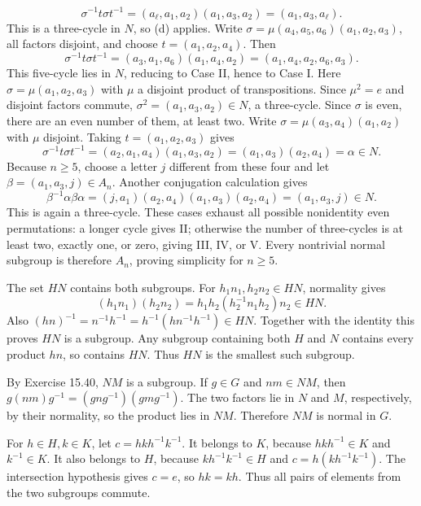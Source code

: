 \begin{enumerate}[label=(\alph*)]
\[\sigma^{-1}t\sigma t^{-1}=(a_\ell,a_1,a_2)(a_1,a_3,a_2)=(a_1,a_3,a_\ell).\]
This is a three-cycle in $N$, so (d) applies.
 Write $\sigma=\mu(a_4,a_5,a_6)(a_1,a_2,a_3)$, all factors disjoint, and choose $t=(a_1,a_2,a_4)$. Then
\[\sigma^{-1}t\sigma t^{-1}=(a_3,a_1,a_6)(a_1,a_4,a_2)=(a_1,a_4,a_2,a_6,a_3).\]
This five-cycle lies in $N$, reducing to Case II, hence to Case I.
 Here $\sigma=\mu(a_1,a_2,a_3)$ with $\mu$ a disjoint product of transpositions. Since $\mu^2=e$ and disjoint factors commute, $\sigma^2=(a_1,a_3,a_2)\in N$, a three-cycle.
 Since $\sigma$ is even, there are an even number of them, at least two. Write $\sigma=\mu(a_3,a_4)(a_1,a_2)$ with $\mu$ disjoint. Taking $t=(a_1,a_2,a_3)$ gives
\[\sigma^{-1}t\sigma t^{-1}=(a_2,a_1,a_4)(a_1,a_3,a_2)=(a_1,a_3)(a_2,a_4)=\alpha\in N.\]
Because $n\ge5$, choose a letter $j$ different from these four and let $\beta=(a_1,a_3,j)\in A_n$. Another conjugation calculation gives
\[\beta^{-1}\alpha\beta\alpha=(j,a_1)(a_2,a_4)(a_1,a_3)(a_2,a_4)=(a_1,a_3,j)\in N.\]
This is again a three-cycle. These cases exhaust all possible nonidentity even permutations: a longer cycle gives II; otherwise the number of three-cycles is at least two, exactly one, or zero, giving III, IV, or V. Every nontrivial normal subgroup is therefore $A_n$, proving simplicity for $n\ge5$.
\end{enumerate}

The set $HN$ contains both subgroups. For $h_1n_1,h_2n_2\in HN$, normality gives
\[(h_1n_1)(h_2n_2)=h_1h_2(h_2^{-1}n_1h_2)n_2\in HN.\]
Also $(hn)^{-1}=n^{-1}h^{-1}=h^{-1}(hn^{-1}h^{-1})\in HN$. Together with the identity this proves $HN$ is a subgroup. Any subgroup containing both $H$ and $N$ contains every product $hn$, so contains $HN$. Thus $HN$ is the smallest such subgroup.

By Exercise 15.40, $NM$ is a subgroup. If $g\in G$ and $nm\in NM$, then $g(nm)g^{-1}=(gng^{-1})(gmg^{-1})$. The two factors lie in $N$ and $M$, respectively, by their normality, so the product lies in $NM$. Therefore $NM$ is normal in $G$.

For $h\in H,k\in K$, let $c=hkh^{-1}k^{-1}$. It belongs to $K$, because $hkh^{-1}\in K$ and $k^{-1}\in K$. It also belongs to $H$, because $kh^{-1}k^{-1}\in H$ and $c=h(kh^{-1}k^{-1})$. The intersection hypothesis gives $c=e$, so $hk=kh$. Thus all pairs of elements from the two subgroups commute.
